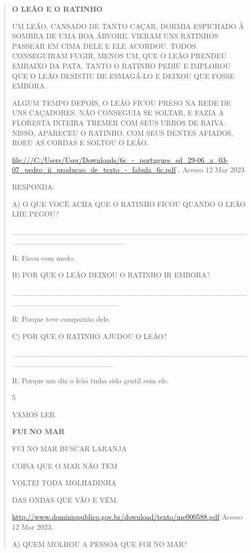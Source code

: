 {{{{\begin{verse}
{{\begin{escolha}
{{{{{\textbf{O LEÃO E O RATINHO}

UM LEÃO, CANSADO DE TANTO CAÇAR, DORMIA ESPICHADO À SOMBRA DE UMA BOA
ÁRVORE. VIERAM UNS RATINHOS PASSEAR EM CIMA DELE E ELE ACORDOU. TODOS
CONSEGUIRAM FUGIR, MENOS UM, QUE O LEÃO PRENDEU EMBAIXO DA PATA. TANTO O
RATINHO PEDIU E IMPLOROU QUE O LEÃO DESISTIU DE ESMAGÁ-LO E DEIXOU QUE
FOSSE EMBORA.

ALGUM TEMPO DEPOIS, O LEÃO FICOU PRESO NA REDE DE UNS CAÇADORES. NÃO
CONSEGUIA SE SOLTAR, E FAZIA A FLORESTA INTEIRA TREMER COM SEUS URROS DE
RAIVA. NISSO, APARECEU O RATINHO. COM SEUS DENTES AFIADOS, ROEU AS
CORDAS E SOLTOU O LEÃO.

\url{file:///C:/Users/User/Downloads/6c_-_portugues_sd_29-06_a_03-07_pedro_ii_producao_de_texto_-_fabula_6c.pdf}
. Acesso 12 Mar 2023.

RESPONDA:

A) O QUE VOCÊ ACHA QUE O RATINHO FICOU QUANDO O LEÃO LHE PEGOU?

\_\_\_\_\_\_\_\_\_\_\_\_\_\_\_\_\_\_\_\_\_\_\_\_\_\_\_\_\_\_\_\_\_\_\_\_\_\_\_\_\_\_\_\_\_\_\_\_\_\_\_\_\_\_\_\_\_\_\_\_\_\_\_\_\_

R: Ficou com medo.

B) POR QUE O LEÃO DEIXOU O RATINHO IR EMBORA?

\_\_\_\_\_\_\_\_\_\_\_\_\_\_\_\_\_\_\_\_\_\_\_\_\_\_\_\_\_\_\_\_\_\_\_\_\_\_\_\_\_\_\_\_\_\_\_\_\_\_\_\_\_\_\_\_\_\_\_\_\_\_\_\_

R: Porque teve compaixão dele.

C) POR QUE O RATINHO AJUDOU O LEÂO?

\_\_\_\_\_\_\_\_\_\_\_\_\_\_\_\_\_\_\_\_\_\_\_\_\_\_\_\_\_\_\_\_\_\_\_\_\_\_\_\_\_\_\_\_\_\_\_\_\_\_\_\_\_\_\_\_\_\_\_\_\_\_\_

R: Porque um dia o leão tinha sido gentil com ele.

\protect\hypertarget{_heading=h.cx2waide4olu}{}{}

\num{5}

VAMOS LER.

\textbf{FUI NO MAR}

FUI NO MAR BUSCAR LARANJA

COISA QUE O MAR NÃO TEM

VOLTEI TODA MOLHADINHA

DAS ONDAS QUE VÃO E VÊM.

\url{http://www.dominiopublico.gov.br/download/texto/me000588.pdf}
Acesso 12 Mar 2023.

A) QUEM MOLHOU A PESSOA QUE FOI NO MAR?

}}}}}
\end{escolha}}}
\end{verse}}}}}
